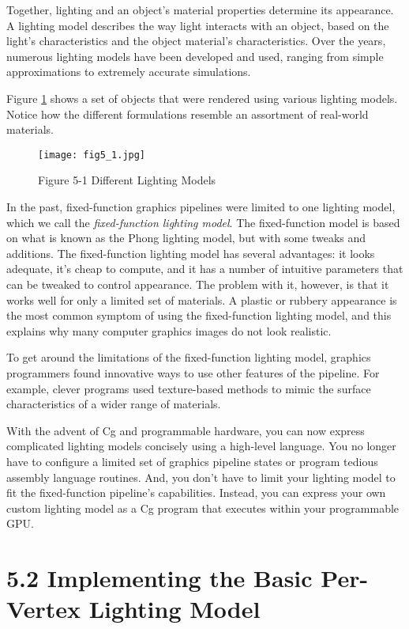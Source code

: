 \documentclass[../main.tex]{subfiles}
\begin{document}
Together, lighting and an object's material properties determine its appearance. A lighting model describes the way light interacts with an object, based on the light's characteristics and the object material's characteristics. Over the years, numerous lighting models have been developed and used, ranging from simple approximations to extremely accurate simulations.

Figure \ref{fig:5-1} shows a set of objects that were rendered using various lighting models. Notice how the different formulations resemble an assortment of real-world materials.

\begin{figure}
    \centering
    \texttt{[image: fig5\_1.jpg]}
    \caption{Figure 5-1 Different Lighting Models}
    \label{fig:5-1}
\end{figure}

In the past, fixed-function graphics pipelines were limited to one lighting model, which we call the \textit{fixed-function lighting model}. The fixed-function model is based on what is known as the Phong lighting model, but with some tweaks and additions. The fixed-function lighting model has several advantages: it looks adequate, it's cheap to compute, and it has a number of intuitive parameters that can be tweaked to control appearance. The problem with it, however, is that it works well for only a limited set of materials. A plastic or rubbery appearance is the most common symptom of using the fixed-function lighting model, and this explains why many computer graphics images do not look realistic.

To get around the limitations of the fixed-function lighting model, graphics programmers found innovative ways to use other features of the pipeline. For example, clever programs used texture-based methods to mimic the surface characteristics of a wider range of materials.

With the advent of Cg and programmable hardware, you can now express complicated lighting models concisely using a high-level language. You no longer have to configure a limited set of graphics pipeline states or program tedious assembly language routines. And, you don't have to limit your lighting model to fit the fixed-function pipeline's capabilities. Instead, you can express your own custom lighting model as a Cg program that executes within your programmable GPU.

\section{5.2 Implementing the Basic Per-Vertex Lighting Model}
\end{document}

